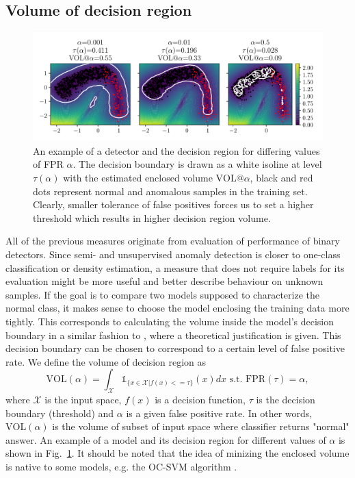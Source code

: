 \subsection{Volume of decision region}
\begin{figure}
\centering
\includegraphics[scale=0.8]{data/chapter_intro/fig_vol_example.pdf}
\caption{An example of a detector and the decision region for differing values of FPR $\alpha$. The decision boundary is drawn as a white isoline at level $\tau(\alpha)$ with the estimated enclosed volume $\text{VOL@}\alpha$, black and red dots represent normal and anomalous samples in the training set. Clearly, smaller tolerance of false positives forces us to set a higher threshold which results in higher decision region volume.}
\label{fig:vol_example}
\end{figure}
All of the previous measures originate from evaluation of performance of binary detectors. Since semi- and unsupervised anomaly detection is closer to one-class classification or density estimation, a measure that does not require labels for its evaluation might be more useful and better describe behaviour on unknown samples. If the goal is to compare two models supposed to characterize the normal class, it makes sense to choose the model enclosing the training data more tightly. This corresponds to calculating  the volume inside the model's decision boundary in a similar fashion to \cite{clemenccon2013scoring}, where a theoretical justification is given. This decision boundary can be chosen to correspond to a certain level of false positive rate. We define the volume of decision region as
\begin{equation}
  \text{VOL}(\alpha) = \int_{\mathcal{X}} \mathds{1}_{\lbrace x\in\mathcal{X}|f(x) <= \tau\rbrace} \left( x \right) dx  \text{ s.t. } \text{FPR}(\tau)=\alpha,
\end{equation}
where $\mathcal{X}$ is the input space, $f(x)$ is a decision function, $\tau$ is the decision boundary (threshold) and $\alpha$ is a given false positive rate. In other words, $\text{VOL}(\alpha)$ is the volume of subset of input space where classifier returns "normal" answer. An example of a model and its decision region for different values of $\alpha$ is shown in Fig.~\ref{fig:vol_example}. It should be noted that the idea of minizing the enclosed volume is native to some models, e.g. the OC-SVM algorithm \cite{scholkopf2001estimating}.


